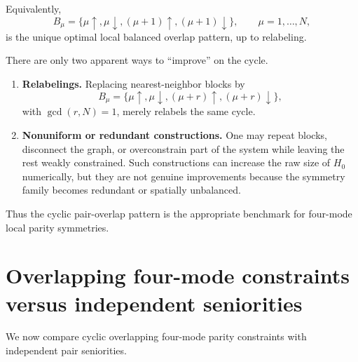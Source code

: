 \documentclass[11pt]{article}
\theoremstyle{definition}
\theoremstyle{remark}
\begin{document}
Equivalently,
\begin{equation}
  \boxed{
  B_\mu
  =
  \{\mu\uparrow,\mu\downarrow,(\mu+1)\uparrow,(\mu+1)\downarrow\},
  \qquad
  \mu=1,\dots,N,
  }
\end{equation}
is the unique optimal local balanced overlap pattern, up to relabeling.

There are only two apparent ways to ``improve'' on the cycle.
\begin{enumerate}[leftmargin=2em]
  \item \textbf{Relabelings.} Replacing nearest-neighbor blocks by
  \begin{equation}
    B_\mu=\{\mu\uparrow,\mu\downarrow,(\mu+r)\uparrow,(\mu+r)\downarrow\},
  \end{equation}
  with $\gcd(r,N)=1$, merely relabels the same cycle.

  \item \textbf{Nonuniform or redundant constructions.} One may repeat blocks, disconnect the graph, or overconstrain part of the system while leaving the rest weakly constrained. Such constructions can increase the raw size of $H_0$ numerically, but they are not genuine improvements because the symmetry family becomes redundant or spatially unbalanced.
\end{enumerate}
Thus the cyclic pair-overlap pattern is the appropriate benchmark for four-mode local parity symmetries.

\section{Overlapping four-mode constraints versus independent seniorities}
We now compare cyclic overlapping four-mode parity constraints with independent pair seniorities.
\end{document}
